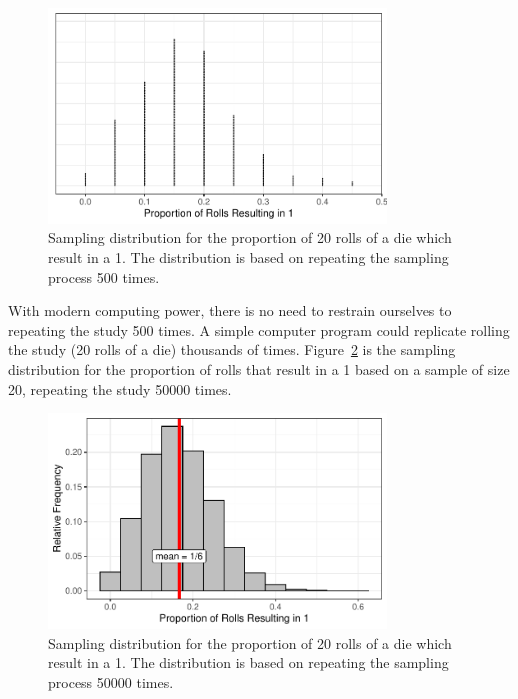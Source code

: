 \documentclass[
  letterpaper,
  DIV=11,
  numbers=noendperiod]{scrreprt}
\theoremstyle{plain}
\theoremstyle{definition}
\theoremstyle{definition}
\theoremstyle{remark}
\begin{document}
\begin{figure}

{\centering \includegraphics[width=0.8\textwidth,height=\textheight]{./images/fig-samplingdistns-dice-dotplot-1.pdf}

}

\caption{\label{fig-samplingdistns-dice-dotplot}Sampling distribution
for the proportion of 20 rolls of a die which result in a 1. The
distribution is based on repeating the sampling process 500 times.}

\end{figure}

With modern computing power, there is no need to restrain ourselves to
repeating the study 500 times. A simple computer program could replicate
rolling the study (20 rolls of a die) thousands of times.
Figure~\ref{fig-samplingdistns-dice-histogram} is the sampling
distribution for the proportion of rolls that result in a 1 based on a
sample of size 20, repeating the study 50000 times.

\begin{figure}

{\centering \includegraphics[width=0.8\textwidth,height=\textheight]{./images/fig-samplingdistns-dice-histogram-1.pdf}

}

\caption{\label{fig-samplingdistns-dice-histogram}Sampling distribution
for the proportion of 20 rolls of a die which result in a 1. The
distribution is based on repeating the sampling process 50000 times.}

\end{figure}
\end{document}
